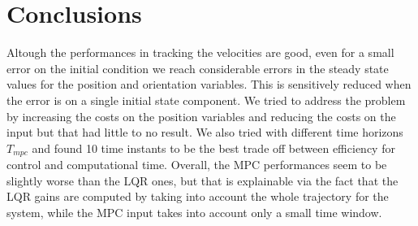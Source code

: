 \section{Conclusions}
Altough the performances in tracking the velocities are good, even for a small error on the initial condition we reach considerable errors in the steady state values for the position and orientation variables. This is sensitively reduced when the error is on a single initial state component. We tried to address the problem by increasing the costs on the position variables and reducing the costs on the input but that had little to no result. We also tried with different time horizons $T_{mpc}$ and found 10 time instants to be the best trade off between efficiency for control and computational time. 
Overall, the MPC performances seem to be slightly worse than the LQR ones, but that is explainable via the fact that the LQR gains are computed by taking into account the whole trajectory for the system, while the MPC input takes into account only a small time window.